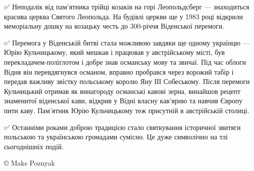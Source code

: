 ✅ Неподалік від пам'ятника трійці козаків на горі Леопольдсберг — знаходиться
красива церква Святого Леопольда. На будівлі церкви ще у 1983 році відкрили
меморіальну дошку на козацьку честь до 300-річчя Віденської перемоги.

✅ Перемога у Віденській битві стала можливою завдяки ще одному українцю — Юрію
Кульчицькому, який мешкав і працював у австрійському місті, був
перекладачем-поліглотом і добре знав османську мову та звичаї. Під час облоги
Відня він перевдягнувся османом, вправно пробрався через ворожий табір і
передав важливу звістку польському королю Яну ІІІ Собеському. Після перемоги
Кульчицький отримав як винагороду османські кавові зерна, винайшов рецепт
знаменитої віденської кави, відкрив у Відні власну кав'ярню та навчив Європу
пити каву. Пам'ятник Юрію Кульчицькому теж присутній в австрійській столиці.

✅ Останніми роками доброю традицією стало святкування історичної звитяги
польською та українською громадами сумісно. Це дуже символічно на тлі
сьогоднішніх подій.

© Maks Poznyak 
